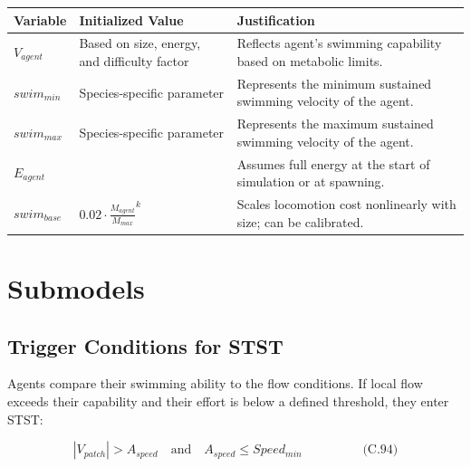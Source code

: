 \documentclass[
]{book}
\begin{document}
\begin{longtable}[]{@{}
  >{\centering\arraybackslash}p{}
  >{\centering\arraybackslash}p{}
  >{\centering\arraybackslash}p{}@{}}
\toprule\noalign{}
\begin{minipage}[b]{\linewidth}\centering
Variable
\end{minipage} & \begin{minipage}[b]{\linewidth}\centering
Initialized Value
\end{minipage} & \begin{minipage}[b]{\linewidth}\centering
Justification
\end{minipage} \\
\midrule\noalign{}
\endhead
\bottomrule\noalign{}
\endlastfoot
\(V_{agent}\) & Based on size, energy, and difficulty factor & Reflects agent's swimming capability based on metabolic limits. \\
\(swim_{min}\) & Species-specific parameter & Represents the minimum sustained swimming velocity of the agent. \\
\(swim_{max}\) & Species-specific parameter & Represents the maximum sustained swimming velocity of the agent. \\
\(E_{agent}\) & 100 & Assumes full energy at the start of simulation or at spawning. \\
\(swim_{base}\) & \(0.02 \cdot \frac{M_{agent}}{M_{max}}^{k}\) & Scales locomotion cost nonlinearly with size; can be calibrated. \\
\end{longtable}

\section{Submodels}\label{submodels-9}

\subsection{Trigger Conditions for STST}\label{trigger-conditions-for-stst}

Agents compare their swimming ability to the flow conditions. If local
flow exceeds their capability and their effort is below a defined
threshold, they enter STST:

\[
\begin{equation} |V_{patch}| > A_{speed} \quad \text{and} \quad A_{speed} \leq Speed_{min}  \hspace{2cm} \text{(C.94)} \end{equation}
\]
\end{document}
